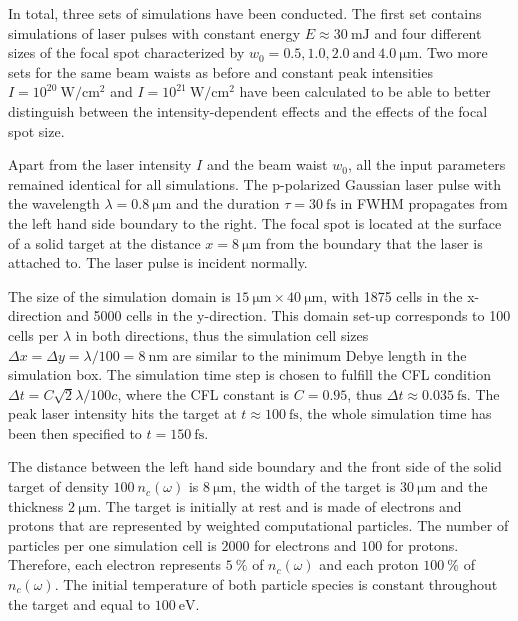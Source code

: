 In total, three sets of simulations have been conducted. The first set contains simulations of laser pulses with constant energy $ E \approx 30 \ \mathrm{mJ} $ and four different sizes of the focal spot characterized by $ w_0 = 0.5, 1.0, 2.0 \ \mathrm{and} \ 4.0 \ \mathrm{\mu m} $. Two more sets for the same beam waists as before and constant peak intensities $ I = 10^{20} \ \mathrm{W/cm^2} $ and $ I = 10^{21} \ \mathrm{W/cm^2} $ have been calculated to be able to better distinguish between the intensity-dependent effects and the effects of the focal spot size.

Apart from the laser intensity $ I $ and the beam waist $ w_0 $, all the input parameters remained identical for all simulations. The p-polarized Gaussian laser pulse with the wavelength $ \lambda = 0.8 \ \mathrm{\mu m} $ and the duration $ \tau = 30 \ \mathrm{fs} $ in FWHM propagates from the left hand side boundary to the right. The focal spot is located at the surface of a solid target at the distance $ x = 8 \ \mathrm{\mu m} $ from the boundary that the laser is attached to. The laser pulse is incident normally.

The size of the simulation domain is $ 15 \ \mathrm{\mu m} \times 40 \ \mathrm{\mu m} $, with 1875 cells in the x-direction and 5000 cells in the y-direction. This domain set-up corresponds to 100 cells per $ \lambda $ in both directions, thus the simulation cell sizes $ \Delta x = \Delta y = \lambda/100 = 8 \ \mathrm{nm} $ are similar to the minimum Debye length in the simulation box. The simulation time step is chosen to fulfill the CFL condition \cite{CFL1967} $ \Delta t = C \sqrt{2} \lambda/ 100 c $, where the CFL constant is $ C = 0.95 $, thus $ \Delta t \approx 0.035 \ \mathrm{fs} $. The peak laser intensity hits the target at $ t \approx 100 \ \mathrm{fs} $, the whole simulation time has been then specified to $ t = 150 \ \mathrm{fs} $.

The distance between the left hand side boundary and the front side of the solid target of density $ 100 \ n_c \left(\omega \right) $ is $ 8 \ \mathrm{\mu m} $, the width of the target is $ 30 \ \mathrm{\mu m} $ and the thickness $ 2 \ \mathrm{\mu m} $. The target is initially at rest and is made of electrons and protons that are represented by weighted computational particles. The number of particles per one simulation cell is $ 2000 $ for electrons and $ 100 $ for protons. Therefore, each electron represents $ 5 \ \% $ of $ n_c \left(\omega \right) $ and each proton $ 100 \ \% $ of $ n_c \left(\omega \right) $. The initial temperature of both particle species is constant throughout the target and equal to $ 100 \ \mathrm{eV} $.

